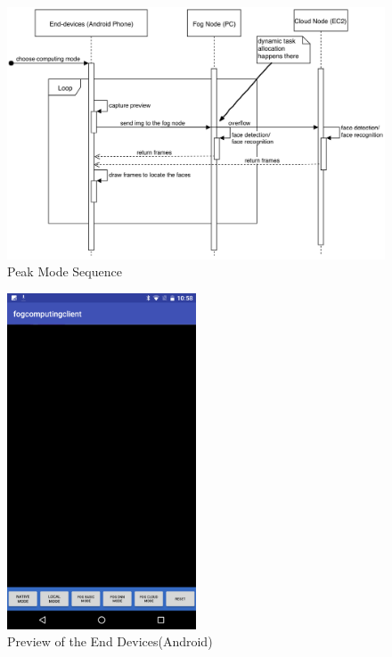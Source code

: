 \begin{figure}
    \centering
    \includegraphics[width=\textwidth]{images/cloud_mode.png}
    \caption{Peak Mode Sequence}
    \label{fig:peak_mode_sequence}
\end{figure}


\begin{figure}
    \centering
    \includegraphics[width=0.5\textwidth]{images/preview.png}
    \caption{Preview of the End Devices(Android)}
    \label{fig:preview}
\end{figure}

